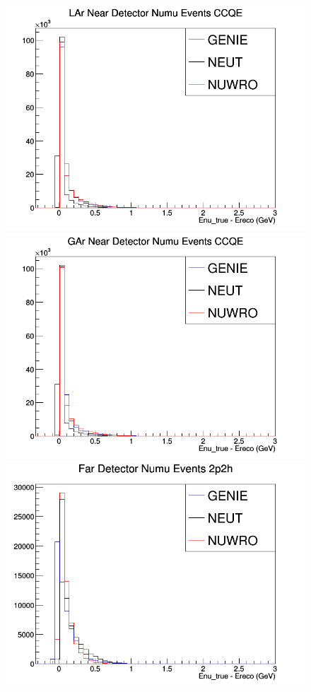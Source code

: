 \begin{figure}[h]
\endminipage
{}
\includegraphics[width=\linewidth]{Ereco_Etrue/numu_LAr_CCQE.png}
\endminipage
{}
\includegraphics[width=\linewidth]{Ereco_Etrue/numu_GAr_CCQE.png}
\endminipage
\newline
{}
\includegraphics[width=\linewidth]{Ereco_Etrue/numu_FD_2p2h.png}

\end{figure}
